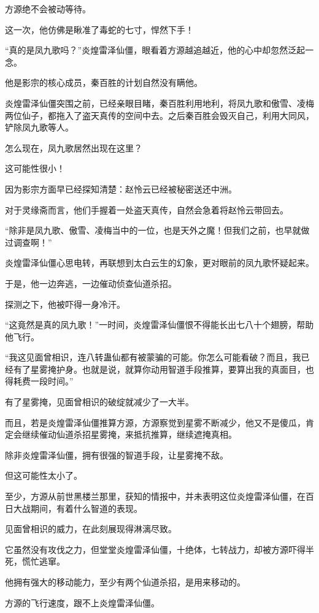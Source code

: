 \begin{this_body}
方源绝不会被动等待。

这一次，他仿佛是瞅准了毒蛇的七寸，悍然下手！

“真的是凤九歌吗？”炎煌雷泽仙僵，眼看着方源越追越近，他的心中却忽然泛起一念。

他是影宗的核心成员，秦百胜的计划自然没有瞒他。

炎煌雷泽仙僵突围之前，已经亲眼目睹，秦百胜利用地利，将凤九歌和傲雪、凌梅两位仙子，都拖入了盗天真传的空间中去。之后秦百胜会毁灭自己，利用大同风，铲除凤九歌等人。

怎么现在，凤九歌居然出现在这里？

这可能性很小！

因为影宗方面早已经探知清楚：赵怜云已经被秘密送还中洲。

对于灵缘斋而言，他们手握着一处盗天真传，自然会急着将赵怜云带回去。

“除非是凤九歌、傲雪、凌梅当中的一位，也是天外之魔！但我们之前，也早就做过调查啊！”

炎煌雷泽仙僵心思电转，再联想到太白云生的幻象，更对眼前的凤九歌怀疑起来。

于是，他一边奔逃，一边催动侦查仙道杀招。

探测之下，他被吓得一身冷汗。

“这竟然是真的凤九歌！”一时间，炎煌雷泽仙僵恨不得能长出七八十个翅膀，帮助他飞行。

“我这见面曾相识，连八转蛊仙都有被蒙骗的可能。你怎么可能看破？而且，我已经有了星雾掩护身。也就是说，就算你动用智道手段推算，要算出我的真面目，也得耗费一段时间。”

有了星雾掩，见面曾相识的破绽就减少了一大半。

而且，若是炎煌雷泽仙僵推算方源，方源察觉到星雾不断减少，他又不是傻瓜，肯定会继续催动仙道杀招星雾掩，来抵抗推算，继续遮掩真相。

除非炎煌雷泽仙僵，拥有很强的智道手段，让星雾掩不敌。

但这可能性太小了。

至少，方源从前世黑楼兰那里，获知的情报中，并未表明这位炎煌雷泽仙僵，在百日大战期间，有着什么智道的表现。

见面曾相识的威力，在此刻展现得淋漓尽致。

它虽然没有攻伐之力，但堂堂炎煌雷泽仙僵，十绝体，七转战力，却被方源吓得半死，慌忙逃窜。

他拥有强大的移动能力，至少有两个仙道杀招，是用来移动的。

方源的飞行速度，跟不上炎煌雷泽仙僵。


\end{this_body}
